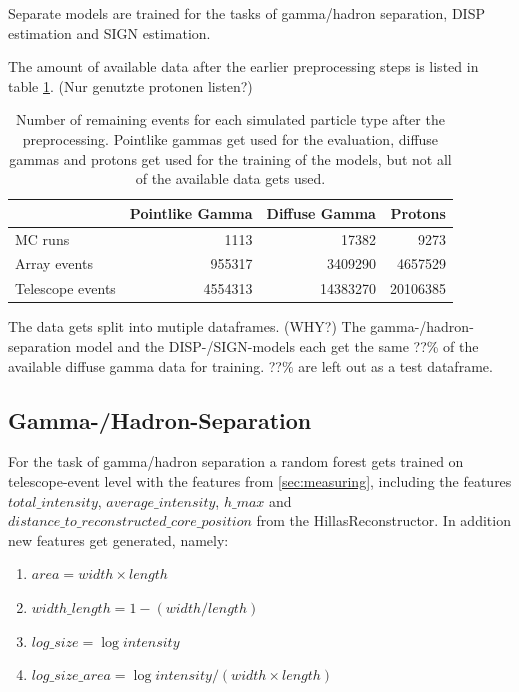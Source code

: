 Separate models are trained for the tasks of gamma/hadron
separation, DISP estimation and SIGN estimation.

The amount of available data after the earlier 
preprocessing steps is listed in table \ref{tab:events_after_prep}.
(Nur genutzte protonen listen?)

\begin{table}
    \caption{Number of remaining events for each simulated particle type after the
    preprocessing. Pointlike gammas get used for the evaluation, diffuse gammas and protons
    get used for the training of the models, but not all of the available data gets used.}
    \begin{center}
        \begin{tabular}{l r r r}
            & Pointlike Gamma & Diffuse Gamma & Protons \\
            \hline
            MC runs & \num{1113} & \num{17382} &  \num{9273} \\ 
            Array events & \num{955317} & \num{3409290} & \num{4657529} \\
            Telescope events & \num{4554313} & \num{14383270} & \num{20106385} \\
        \end{tabular}
    \end{center}
    \label{tab:events_after_prep}
\end{table}

The data gets split into mutiple dataframes. (WHY?)
The gamma-/hadron-separation model and the DISP-/SIGN-models each get the same
??\% of the available diffuse gamma data for training. ??\% are left out
as a test dataframe.

\subsection{Gamma-/Hadron-Separation}
\label{sec:gh_sep}

For the task of gamma/hadron separation a random forest gets trained
on telescope-event level with the features from \ref{sec:measuring}, including
the features $total\_intensity$, $average\_intensity$, $h\_max$
and $distance\_to\_reconstructed\_core\_position$ from the
HillasReconstructor.
In addition new features get generated, namely:

\begin{enumerate}
    \item $area = width \times length$
    \item $width\_length = 1 - (width/length)$
    \item $log\_size = \log{intensity}$
    \item $log\_size\_area = \log{intensity} / (width \times length)$
\end{enumerate}


